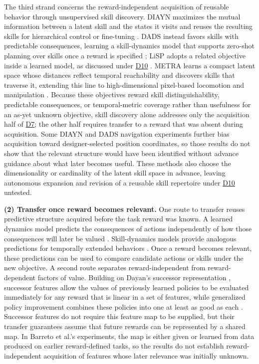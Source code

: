 \documentclass[10pt,journal,compsoc]{IEEEtran}
\DeclareRobustCommand{\Dref}[1]{\hyperref[sec:d#1]{D#1}}
\begin{document}
The third strand concerns the reward-independent acquisition of reusable behavior through unsupervised skill discovery.
DIAYN maximizes the mutual information between a latent skill and the states it visits and reuses the resulting skills for hierarchical control or fine-tuning \cite{eysenbach2019}.
DADS instead favors skills with predictable consequences, learning a skill-dynamics model that supports zero-shot planning over skills once a reward is specified \cite{sharma2020}; LiSP adopts a related objective inside a learned model, as discussed under \Dref{10} \cite{lu2021}.
METRA learns a compact latent space whose distances reflect temporal reachability and discovers skills that traverse it, extending this line to high-dimensional pixel-based locomotion and manipulation \cite{park2024}.
Because these objectives reward skill distinguishability, predictable consequences, or temporal-metric coverage rather than usefulness for an as-yet unknown objective, skill discovery alone addresses only the acquisition half of \Dref{7}; the other half requires transfer to a reward that was absent during acquisition.
Some DIAYN and DADS navigation experiments further bias acquisition toward designer-selected position coordinates, so those results do not show that the relevant structure would have been identified without advance guidance about what later becomes useful.
These methods also choose the dimensionality or cardinality of the latent skill space in advance, leaving autonomous expansion and revision of a reusable skill repertoire under \Dref{10} untested.

\noindent\textbf{(2) Transfer once reward becomes relevant.}
One route to transfer reuses predictive structure acquired before the task reward was known.
A learned dynamics model predicts the consequences of actions independently of how those consequences will later be valued \cite{sekar2020,jin2020}.
Skill-dynamics models provide analogous predictions for temporally extended behaviors \cite{sharma2020}.
Once a reward becomes relevant, these predictions can be used to compare candidate actions or skills under the new objective.
A second route separates reward-independent from reward-dependent factors of value.
Building on Dayan's successor representation \cite{dayan1993b}, successor features allow the values of previously learned policies to be evaluated immediately for any reward that is linear in a set of features, while generalized policy improvement combines these policies into one at least as good as each \cite{barreto2017}.
Successor features do not require this feature map to be supplied, but their transfer guarantees assume that future rewards can be represented by a shared map.
In Barreto et al.'s experiments, the map is either given or learned from data produced on earlier reward-defined tasks, so the results do not establish reward-independent acquisition of features whose later relevance was initially unknown.
\end{document}
